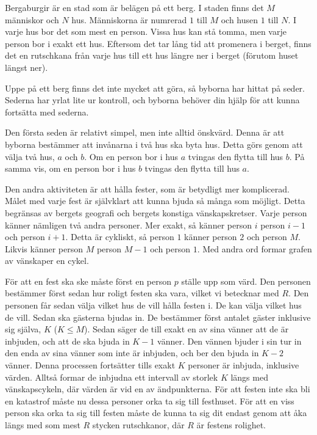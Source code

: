 Bergaburgir är en stad som är belägen på ett berg.
I staden finns det $M$ människor och $N$ hus.
Människorna är numrerad $1$ till $M$ och husen $1$ till $N$.
I varje hus bor det som mest en person.
Vissa hus kan stå tomma, men varje person bor i exakt ett hus.
Eftersom det tar lång tid att promenera i berget, finns det en rutschkana från varje hus till ett hus längre ner i berget (förutom huset längst ner).

Uppe på ett berg finns det inte mycket att göra, så byborna har hittat på seder.
Sederna har yrlat lite ur kontroll, och byborna behöver din hjälp för att kunna fortsätta med sederna.

Den första seden är relativt simpel, men inte alltid önskvärd.
Denna är att byborna bestämmer att invånarna i två hus ska byta hus.
Detta görs genom att välja två hus, $a$ och $b$.
Om en person bor i hus $a$ tvingas den flytta till hus $b$.
På samma vis, om en person bor i hus $b$ tvingas den flytta till hus $a$.

Den andra aktiviteten är att hålla fester, som är betydligt mer komplicerad.
Målet med varje fest är självklart att kunna bjuda så många som möjligt.
Detta begränsas av bergets geografi och bergets konstiga vänskapskretser.
Varje person känner nämligen två andra personer.
Mer exakt, så känner person $i$ person $i-1$ och person $i+1$.
Detta är cykliskt, så person $1$ känner person $2$ och person $M$.
Likvis känner person $M$ person $M-1$ och person $1$.
Med andra ord formar grafen av vänskaper en cykel.

För att en fest ska ske måste först en person $p$ ställe upp som värd.
Den personen bestämmer först sedan hur roligt festen ska vara, vilket vi betecknar med $R$.
Den personen får sedan välja vilket hus de vill hålla festen i.
De kan välja vilket hus de vill.
Sedan ska gästerna bjudas in.
De bestämmer först antalet gäster inklusive sig själva, $K$ ($K \leq M$).
Sedan säger de till exakt en av sina vänner att de är inbjuden, och att de ska bjuda in $K-1$ vänner.
Den vännen bjuder i sin tur in den enda av sina vänner som inte är inbjuden, och ber den bjuda in $K-2$ vänner.
Denna processen fortsätter tills exakt $K$ personer är inbjuda, inklusive värden.
Alltså formar de inbjudna ett intervall av storlek $K$ längs med vänskapscykeln, där värden är vid en av ändpunkterna.
För att festen inte ska bli en katastrof måste nu dessa personer orka ta sig till festhuset.
För att en viss person ska orka ta sig till festen måste de kunna ta sig dit endast genom att åka längs
med som mest $R$ stycken rutschkanor, där $R$ är festens rolighet.


